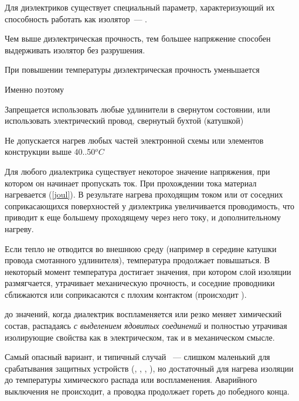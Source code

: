 \bigskip
Для диэлектриков существует специальный параметр, характеризующий их способность
работать как изолятор\ --- .

\begin{framed}\noindent
Чем выше диэлектрическая прочность, тем большее напряжение способен выдерживать
изолятор без разрушения.
\end{framed}

\begin{framed}\noindent
При повышении температуры диэлектрическая прочность уменьшается 
\end{framed}

Именно поэтому

\begin{alarmbox}
Запрещается использовать любые удлинители в свернутом состоянии, или
использовать электрический провод, свернутый бухтой (катушкой)
\end{alarmbox}

\begin{alarmbox}
Не допускается нагрев любых частей электронной схемы или элементов
конструкции выше 40..50$^{o}C$
\end{alarmbox}

Для любого диалектрика существует некоторое значение напряжения, при котором он
начинает пропускать ток. При прохождении тока материал нагревается (\ref{joul}).
В результате нагрева проходящим током или от соседних соприкасающихся
поверхностей у диэлектрика увеличивается проводимость, что приводит к еще
большему проходящему через него току, и дополнительному нагреву. 

Если тепло не отводится во внешнюю среду (например в середине катушки провода
смотанного удлинителя), температура продолжает повышаться. В некоторый момент
температура достигает значения, при котором слой изоляции размягчается,
утрачивает механическую прочность, и соседние проводники сближаются или
соприкасаются с плохим контактом (происходит ).

до значений, когда диалектрик воспламеняется или резко меняет химический состав,
распадаясь \emph{с выделением ядовитых соединений} и полностью утрачивая
изолирующие свойства как в электрическом, так и в механическом смысле.

Самый опасный вариант, и типичный случай \ --- 
слишком маленький для срабатывания защитных устройств
(, ,
, ), но достаточный для нагрева изоляции до
температуры химического распада или воспламенения. Аварийного выключения не
происходит, а проводка продолжает гореть до победного конца. 


